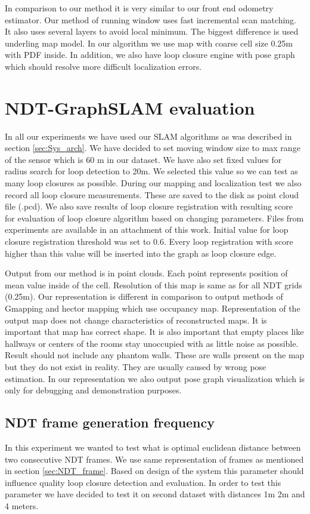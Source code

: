In comparison to our method it is very similar to our front end odometry estimator. Our method of running window uses fast incremental scan matching. It also uses several layers to avoid local minimum. The biggest difference is used underling map model. In our algorithm we use map with coarse cell size 0.25m with \gls{PDF} inside. In addition, we also have loop closure engine with pose graph which should resolve more difficult localization errors.

\section{NDT-GraphSLAM evaluation}
In all our experiments we have used our \gls{SLAM} algorithms as was described in section \ref{sec:Sys_arch}. We have decided to set moving window size to max range of the sensor which is 60 m in our dataset. We have also set fixed values for radius search for loop detection to 20m. We selected this value so we can test as many loop closures as possible. During our mapping and localization test we also record all loop closure measurements. These are saved to the disk as point cloud file (.pcd). We also save results of loop closure registration with resulting score for evaluation of loop closure algorithm based on changing parameters. Files from experiments are available in an attachment of this work. Initial value for loop closure registration threshold was set to 0.6. Every loop registration with score higher than this value will be inserted into the graph as loop closure edge. 

Output from our method is in point clouds. Each point represents position of mean value inside of the cell. Resolution of this map is same as for all \gls{NDT} grids (0.25m). Our representation is different in  comparison to output methods of Gmapping and hector mapping which use occupancy map. Representation of the output map does not change characteristics of reconstructed maps. It is important that map has correct shape. It is also important that empty places like hallways or centers of the rooms stay unoccupied with as little noise as possible. Result should not include any phantom walls. These are walls present on the map but they do not exist in reality. They are usually caused by wrong pose estimation. In our representation we also output pose graph visualization which is only for debugging and demonstration purposes. 

\subsection{NDT frame generation frequency}
In this experiment we wanted to test what is optimal euclidean distance between two consecutive \gls{NDT} frames. We use same representation of frames as mentioned in section \ref{sec:NDT_frame}. Based on design of the system this parameter should influence quality loop closure detection and evaluation. In order to test this parameter we have decided to test it on second dataset with distances 1m 2m and 4 meters.

